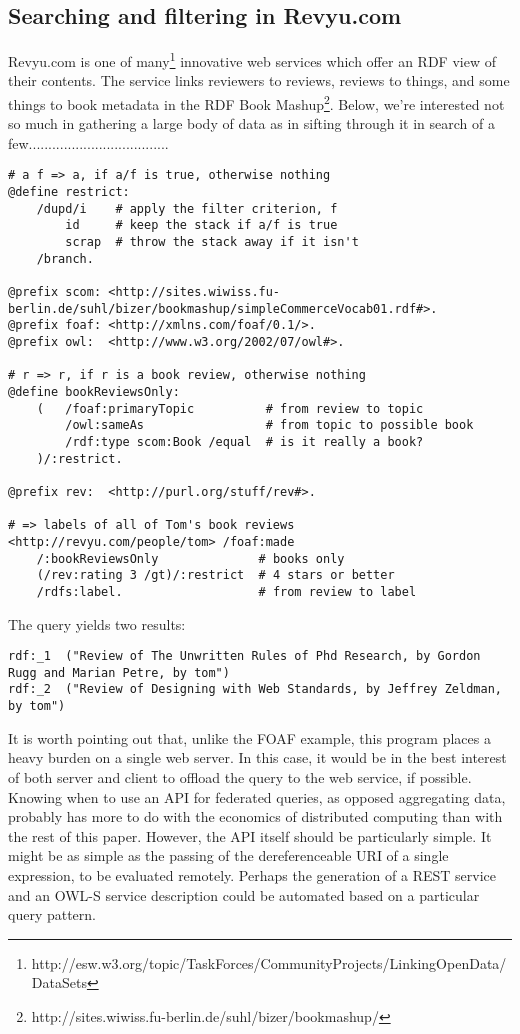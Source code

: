 \documentclass[runningheads]{llncs}
\begin{document}
\subsection{Searching and filtering in Revyu.com}

Revyu.com is one of many\footnote{http://esw.w3.org/topic/TaskForces/CommunityProjects/LinkingOpenData/DataSets} innovative web services which offer an RDF view of their contents.  The service links reviewers to reviews, reviews to things, and some things to book metadata in the RDF Book Mashup\footnote{http://sites.wiwiss.fu-berlin.de/suhl/bizer/bookmashup/}.  Below, we're interested not so much in gathering a large body of data as in sifting through it in search of a few....................................

\begin{verbatim}
# a f => a, if a/f is true, otherwise nothing
@define restrict:
    /dupd/i    # apply the filter criterion, f
        id     # keep the stack if a/f is true
        scrap  # throw the stack away if it isn't
    /branch.

@prefix scom: <http://sites.wiwiss.fu-berlin.de/suhl/bizer/bookmashup/simpleCommerceVocab01.rdf#>.
@prefix foaf: <http://xmlns.com/foaf/0.1/>.
@prefix owl:  <http://www.w3.org/2002/07/owl#>.

# r => r, if r is a book review, otherwise nothing
@define bookReviewsOnly:
    (   /foaf:primaryTopic          # from review to topic
        /owl:sameAs                 # from topic to possible book
        /rdf:type scom:Book /equal  # is it really a book?
    )/:restrict.

@prefix rev:  <http://purl.org/stuff/rev#>.

# => labels of all of Tom's book reviews
<http://revyu.com/people/tom> /foaf:made
    /:bookReviewsOnly              # books only
    (/rev:rating 3 /gt)/:restrict  # 4 stars or better
    /rdfs:label.                   # from review to label
\end{verbatim}
The query yields two results:
\begin{verbatim}
rdf:_1  ("Review of The Unwritten Rules of Phd Research, by Gordon Rugg and Marian Petre, by tom")
rdf:_2  ("Review of Designing with Web Standards, by Jeffrey Zeldman, by tom")
\end{verbatim}
It is worth pointing out that, unlike the FOAF example, this program places a heavy burden on a single web server.  In this case, it would be in the best interest of both server and client to offload the query to the web service, if possible.  Knowing when to use an API for federated queries, as opposed aggregating data, probably has more to do with the economics of distributed computing than with the rest of this paper.  However, the API itself should be particularly simple.  It might be as simple as the passing of the dereferenceable URI of a single expression, to be evaluated remotely.  Perhaps the generation of a REST service and an OWL-S service description could be automated based on a particular query pattern.
\end{document}
